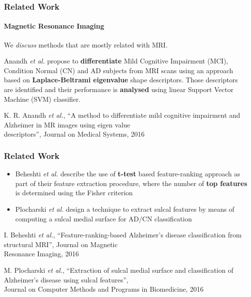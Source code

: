 \begin{frame}
	\frametitle{Related Work}
	\framesubtitle{Magnetic Resonance Imaging}
	
	\Large
	
	\vspace{0.67cm}
	
	We \emph{discuss} methods that are mostly related with MRI.
	
	\vspace{0.3cm}
	
	Anandh \emph{et al.} \cite{Anandh16} propose to \textbf{differentiate} Mild Cognitive Impairment
	(MCI), Condition Normal (CN) and AD subjects from MRI scans using an approach based on
	\textbf{Laplace-Beltrami eigenvalue} shape descriptors. Those descriptors are identified and their
	performance is \textbf{analysed} using linear Support Vector Machine (SVM) classifier.
	
	\vspace{0.6cm}
	
	\tiny
	
	\cite{Anandh16} K. R. Anandh \emph{et al.}, ``A method to differentiate mild cognitive impairment
	and Alzheimer in MR images using eigen value\\ \hspace{0.25cm} descriptors'', Journal on Medical
	Systems, 2016
\end{frame}

\begin{frame}
	\frametitle{Related Work}
	
	\Large
	
	\vspace{1cm}
	
	\begin{itemize}
		\item Beheshti \emph{et al.} \cite{Beheshti16} describe the use of \textbf{t-test} based
			  feature-ranking approach as part of their feature extraction procedure, where the number
			  of \textbf{top features} is determined using the Fisher criterion
		\vspace{0.2cm}
		\item Plocharski \emph{et al.} \cite{Plocharski16} design a technique to extract sulcal features
			  by means of computing a sulcal medial surface for AD/CN classification
	\end{itemize}
	
	\vspace{0.7cm}
	
	\tiny
	
	\cite{Beheshti16} I. Beheshti \emph{et al.}, ``Feature-ranking-based Alzheimer's disease
	classification from structural MRI'', Journal on Magnetic\\ \hspace{0.25cm} Resonance Imaging, 2016
	
	\cite{Plocharski16} M. Plocharski \emph{et al.}, ``Extraction of sulcal medial surface and
	classification of Alzheimer's disease using sulcal features'',\\ \hspace{0.25cm} Journal on
	Computer Methods and Programs in Biomedicine, 2016
\end{frame}

